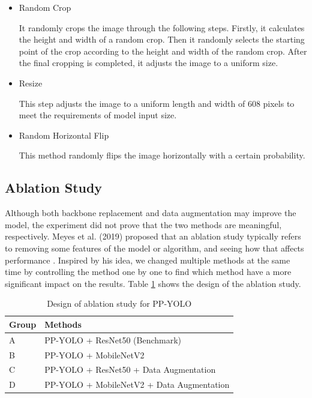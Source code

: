 \documentclass[sensors,article,submit,moreauthors,pdftex]{Definitions/mdpi}
\begin{document}
\begin{itemize}
\begin{itemize}
\end{itemize}


\begin{itemize}
\item{Random Crop}

 It randomly crops the image through the following steps. Firstly, it calculates the height and width of a random crop. Then it randomly selects the starting point of the crop according to the height and width of the random crop. After the final cropping is completed, it adjusts the image to a uniform size.

\end{itemize}


\begin{itemize}
\item{Resize}

This step adjusts the image to a uniform length and width of 608 pixels to meet the requirements of model input size.

\end{itemize}


\begin{itemize}
\item{Random Horizontal Flip}

This method randomly flips the image horizontally with a certain probability.

\end{itemize}
\end{itemize}


\subsection{Ablation Study}
Although both backbone replacement and data augmentation may improve the model, the experiment did not prove that the two methods are meaningful, respectively. Meyes et al. (2019) proposed that an ablation study typically refers to removing some features of the model or algorithm, and seeing how that affects performance \cite{meyes2019ablation}.
Inspired by his idea, we changed multiple methods at the same time by controlling the method one by one to find which method have a more significant impact on the results. Table \ref{tbl:design of ablation study for PP-YOLO} shows the design of the ablation study.

\begin{table}[htbp]
\centering
\caption{Design of ablation study for PP-YOLO}
\begin{tabular}{ll} 
\toprule
\textbf{Group}&\textbf{Methods}\\
\midrule
A& PP-YOLO + ResNet50 (Benchmark) \\
\cmidrule(r){1-2}
B& PP-YOLO + MobileNetV2 \\
C& PP-YOLO + ResNet50 + Data Augmentation \\
D& PP-YOLO + MobileNetV2 + Data Augmentation\\
\bottomrule
\end{tabular}
\label{tbl:design of ablation study for PP-YOLO}
\end{table}
\end{document}
